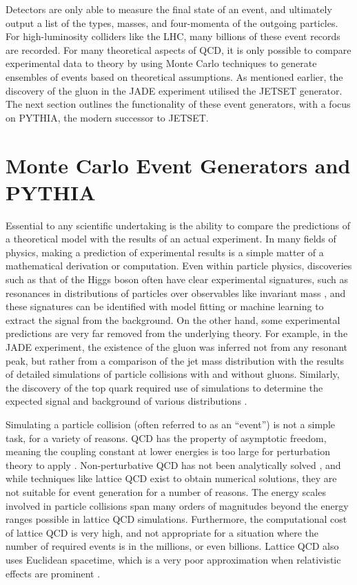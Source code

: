 \documentclass[12pt,a4paper]{report}
\begin{document}
Detectors are only able to measure the final state of an event, and ultimately output a list of the types, masses, and four-momenta of the outgoing particles. For high-luminosity colliders like the LHC, many billions of these event records are recorded. For many theoretical aspects of QCD, it is only possible to compare experimental data to theory by using Monte Carlo techniques to generate ensembles of events based on theoretical assumptions. As mentioned earlier, the discovery of the gluon in the JADE experiment utilised the JETSET generator. The next section outlines the functionality of these event generators, with a focus on PYTHIA, the modern successor to JETSET.

\section{Monte Carlo Event Generators and PYTHIA}
Essential to any scientific undertaking is the ability to compare the predictions of a theoretical model with the results of an actual experiment. In many fields of physics, making a prediction of experimental results is a simple matter of a mathematical derivation or computation. Even within particle physics, discoveries such as that of the Higgs boson often have clear experimental signatures, such as resonances in distributions of particles over observables like invariant mass \cite{atlas_observation_2012}, and these signatures can be identified with model fitting or machine learning to extract the signal from the background. On the other hand, some experimental predictions are very far removed from the underlying theory. For example, in the JADE experiment, the existence of the gluon was inferred not from any resonant peak, but rather from a comparison of the jet mass distribution with the results of detailed simulations of particle collisions with and without gluons. Similarly, the discovery of the top quark required use of simulations to determine the expected signal and background of various distributions \cite{CDF:1995wbb,D0:1995jca}.

Simulating a particle collision (often referred to as an ``event'') is not a simple task, for a variety of reasons. QCD has the property of asymptotic freedom, meaning the coupling constant at lower energies is too large for perturbation theory to apply \cite{Gross:1973ju,Politzer:1974fr}. Non-perturbative QCD has not been analytically solved \cite{navas_review_2024}, and while techniques like lattice QCD exist to obtain numerical solutions, they are not suitable for event generation for a number of reasons. The energy scales involved in particle collisions span many orders of magnitudes beyond the energy ranges possible in lattice QCD simulations. Furthermore, the computational cost of lattice QCD is very high, and not appropriate for a situation where the number of required events is in the millions, or even billions. Lattice QCD also uses Euclidean spacetime, which is a very poor approximation when relativistic effects are prominent \cite{Salam:2010zt}.
\end{document}
